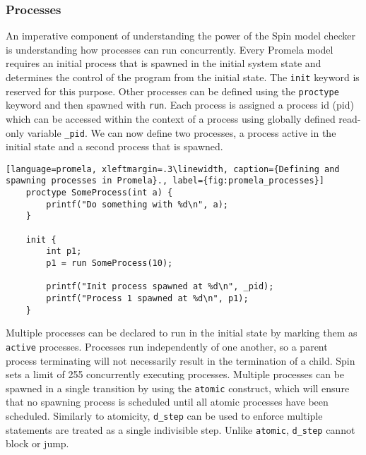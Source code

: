 \subsubsection[]{Processes}
An imperative component of understanding the power of the Spin model checker is understanding how processes can run concurrently. Every Promela model requires an initial process that is spawned in the initial system state and determines the control of the program from the initial state. The \texttt{init} keyword is reserved for this purpose. Other processes can be defined using the \texttt{proctype} keyword and then spawned with \texttt{run}. Each process is assigned a process id (pid) which can be accessed within the context of a process using globally defined read-only variable \texttt{\_pid}. We can now define two processes, a process active in the initial state and a second process that is spawned.
\begin{lstlisting}[language=promela, xleftmargin=.3\linewidth, caption={Defining and spawning processes in Promela}., label={fig:promela_processes}]
    proctype SomeProcess(int a) {
        printf("Do something with %d\n", a);
    }
    
    init {
        int p1;
        p1 = run SomeProcess(10);

        printf("Init process spawned at %d\n", _pid);
        printf("Process 1 spawned at %d\n", p1);
    }
\end{lstlisting}
Multiple processes can be declared to run in the initial state by marking them as \texttt{active} processes. Processes run independently of one another, so a parent process terminating will not necessarily result in the termination of a child. Spin sets a limit of 255 concurrently executing processes. Multiple processes can be spawned in a single transition by using the \texttt{atomic} construct, which will ensure that no spawning process is scheduled until all atomic processes have been scheduled. Similarly to atomicity, \texttt{d\_step} can be used to enforce multiple statements are treated as a single indivisible step. Unlike \texttt{atomic}, \texttt{d\_step} cannot block or jump.
